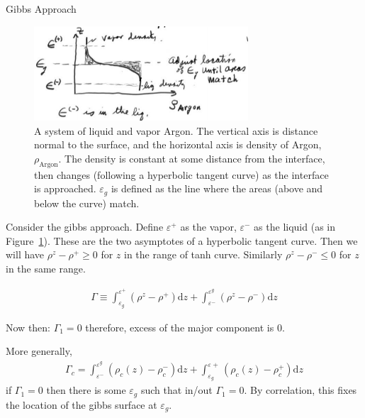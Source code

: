 \documentclass{article}
\renewcommand{\d}{\mathrm{d}}
\begin{document}
\begin{section}{Gibbs Approach}

	\begin{figure}[h]
		\centering
		\includegraphics[height=100pt]{GibbsApproach}
		\caption{A system of liquid and vapor Argon. The vertical axis is distance normal to the surface, and the horizontal axis is density of Argon, $\rho_\text{Argon}$. The density is constant at some distance from the interface, then changes (following a hyperbolic tangent curve) as the interface is approached. $\varepsilon_g$ is defined as the line where the areas (above and below the curve) match.}
		\label{fig:Gibbs Surface Level}
	\end{figure}
	Consider the gibbs approach. Define $\varepsilon^+$ as the vapor, $\varepsilon^-$ as the liquid (as in Figure~\ref{fig:Gibbs Surface Level}). These are the two asymptotes of a hyperbolic tangent curve. Then we will have $\rho^z - \rho^+ \geq 0$ for $z$ in the range of tanh curve.
	Similarly $\rho^z - \rho^- \leq 0$ for $z$ in the same range.

	\begin{align*}\Gamma \equiv \int_{\varepsilon_g}^{\varepsilon^+}( \rho^z - \rho^+ )\d z + \int_{\varepsilon^-}^{\varepsilon^g}( \rho^z - \rho^-) \d z
	\end{align*}

	Now then: $\Gamma_1 = 0$ therefore, excess of the major component is 0.

	More generally,
	\begin{align*}
		\Gamma_c = \int_{\varepsilon^-}^{\varepsilon^g}(\rho_c(z) - \rho_c^-)\d z + \int_{\varepsilon_g}^{\varepsilon+} (\rho_c(z) - \rho_c^+)\d z
	\end{align*}
	if $\Gamma_1 = 0$ then there is some $\varepsilon_g$ such that in/out $\Gamma_1 = 0$. By correlation, this fixes the location of the gibbs surface at $\varepsilon_g$. 


\end{section}
\end{document}
